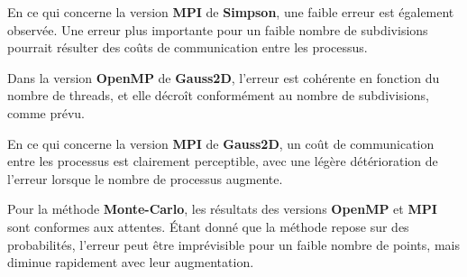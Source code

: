 \documentclass[10pt,a4paper]{article}
\begin{document}
En ce qui concerne la version \textbf{MPI} de \textbf{Simpson}, une faible erreur est également observée. Une erreur plus importante pour un faible nombre de subdivisions pourrait résulter des coûts de communication entre les processus.

Dans la version \textbf{OpenMP} de \textbf{Gauss2D}, l'erreur est cohérente en fonction du nombre de threads, et elle décroît conformément au nombre de subdivisions, comme prévu.

En ce qui concerne la version \textbf{MPI} de \textbf{Gauss2D}, un coût de communication entre les processus est clairement perceptible, avec une légère détérioration de l'erreur lorsque le nombre de processus augmente.


Pour la méthode \textbf{Monte-Carlo}, les résultats des versions \textbf{OpenMP} et \textbf{MPI} sont conformes aux attentes. Étant donné que la méthode repose sur des probabilités, l'erreur peut être imprévisible pour un faible nombre de points, mais diminue rapidement avec leur augmentation.
\end{document}
